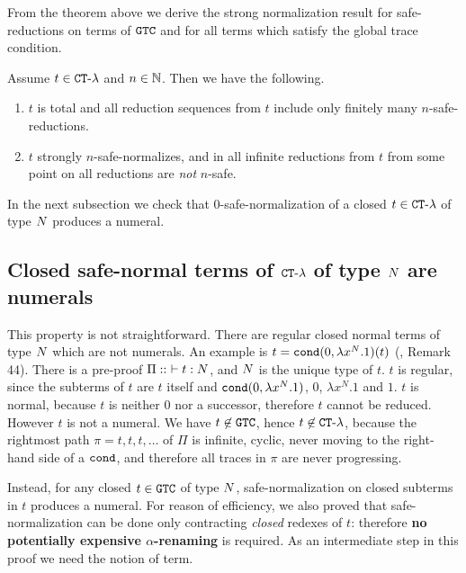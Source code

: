 

From the theorem above we derive the strong normalization result 
for safe-reductions on terms of ${\tt GTC}$
and for all terms which satisfy the global trace condition.

\begin{corollary}\label{cor:SN_GTC}
\label{corollary-finite-safe-reduction}
  Assume  $t \in { {\tt CT}\mbox{-}\lambda}$ and $n \in \mathbb{N}$. Then we have the following. 
  \begin {enumerate}
  \item
    $t$ is total and all reduction sequences
    from $t$ include only finitely many $n$-safe-reductions.
  \item
    $t$ strongly $n$-safe-normalizes, and in all infinite reductions from $t$
    from some point on all reductions are \emph{not} $n$-safe.
   \end{enumerate}

\end{corollary}

In the next subsection we check that $0$-safe-normalization of a closed $t \in { {\tt CT}\mbox{-}\lambda}$
of type ${N}$ produces a numeral.


\subsection{Closed safe-normal terms of ${ {\tt CT}\mbox{-}\lambda}$ of type ${N}$ are numerals}
This property is not straightforward. 
There are regular closed normal terms of type ${N}$ which are not numerals.
An example is $t = {\tt cond}(0, \lambda x^N.1)(t)$ 
(\cite{2021-Anupam-Das}, Remark 44). 
There is a pre-proof $\Pi::\ \vdash t: {N}$, and ${N}$ is the unique type of $t$. 
$t$ is regular, since the subterms of $t$ are
$t$ itself and ${\tt cond}(0, \lambda x^N.1)$, $0$, $\lambda x^N.1$ and $1$.
$t$ is normal, because $t$ is neither $0$ nor a successor, 
therefore $t$ cannot be reduced. However $t$ is not a numeral.
We have $t \not \in {\tt GTC}$, hence $t \not \in { {\tt CT}\mbox{-}\lambda}$, because
the rightmost path $\pi = t,t,t,\ldots$ of $\Pi$ is infinite, cyclic, 
never moving to the right-hand side of a ${\tt cond}$,
and therefore all traces in $\pi$ are never progressing.

Instead, for any closed $t \in {\tt GTC}$ of type ${N}$, safe-normalization on closed subterms in $t$
produces a numeral. For reason of efficiency,
we also proved that safe-normalization can be done only contracting 
\emph{closed} redexes of $t$: therefore 
{\bf no potentially expensive $\alpha$-renaming} is required.
As an intermediate step in this proof we need the notion of 
 term.

